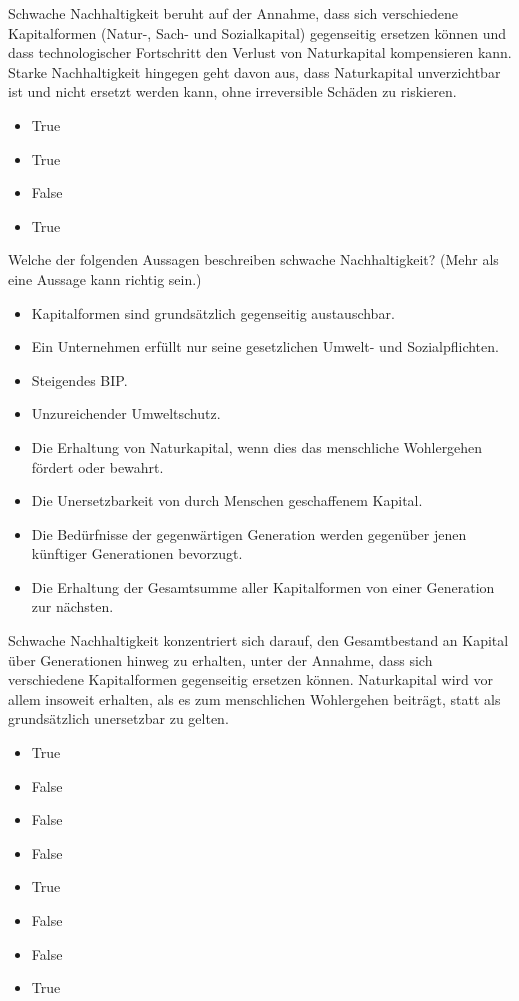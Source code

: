\documentclass[
  nswissgerman,
  a4paper,
  DIV=11,
  numbers=noendperiod,
  oneside,
  openany]{scrreprt}
\providecommand{\tightlist}{%
  \setlength{\itemsep}{0pt}\setlength{\parskip}{0pt}}
\begin{document}
Schwache Nachhaltigkeit beruht auf der Annahme, dass sich verschiedene
Kapitalformen (Natur-, Sach- und Sozialkapital) gegenseitig ersetzen
können und dass technologischer Fortschritt den Verlust von Naturkapital
kompensieren kann. Starke Nachhaltigkeit hingegen geht davon aus, dass
Naturkapital unverzichtbar ist und nicht ersetzt werden kann, ohne
irreversible Schäden zu riskieren.

\begin{itemize}
\tightlist
\item
  True
\item
  True
\item
  False
\item
  True
\end{itemize}

Welche der folgenden Aussagen beschreiben schwache Nachhaltigkeit? (Mehr
als eine Aussage kann richtig sein.)

\begin{itemize}
\tightlist
\item[$\square$]
  Kapitalformen sind grundsätzlich gegenseitig austauschbar.
\item[$\square$]
  Ein Unternehmen erfüllt nur seine gesetzlichen Umwelt- und
  Sozialpflichten.
\item[$\square$]
  Steigendes BIP.
\item[$\square$]
  Unzureichender Umweltschutz.
\item[$\square$]
  Die Erhaltung von Naturkapital, wenn dies das menschliche Wohlergehen
  fördert oder bewahrt.
\item[$\square$]
  Die Unersetzbarkeit von durch Menschen geschaffenem Kapital.
\item[$\square$]
  Die Bedürfnisse der gegenwärtigen Generation werden gegenüber jenen
  künftiger Generationen bevorzugt.
\item[$\square$]
  Die Erhaltung der Gesamtsumme aller Kapitalformen von einer Generation
  zur nächsten.
\end{itemize}

Schwache Nachhaltigkeit konzentriert sich darauf, den Gesamtbestand an
Kapital über Generationen hinweg zu erhalten, unter der Annahme, dass
sich verschiedene Kapitalformen gegenseitig ersetzen können.
Naturkapital wird vor allem insoweit erhalten, als es zum menschlichen
Wohlergehen beiträgt, statt als grundsätzlich unersetzbar zu gelten.

\begin{itemize}
\tightlist
\item
  True
\item
  False
\item
  False
\item
  False
\item
  True
\item
  False
\item
  False
\item
  True
\end{itemize}
\end{document}
